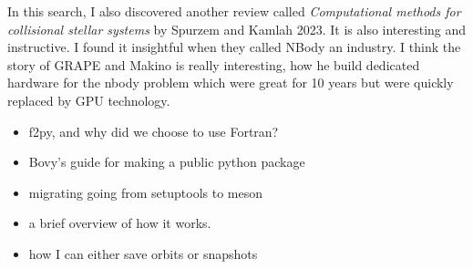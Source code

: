    In this search, I also discovered another review called \textit{Computational methods for collisional stellar systems} by Spurzem and Kamlah 2023. It is also interesting and instructive. I found it insightful when they called NBody an industry. I think the story of GRAPE and Makino is really interesting, how he build dedicated hardware for the nbody problem which were great for 10 years but were quickly replaced by GPU technology. 
    \begin{itemize}
        \item f2py, and why did we choose to use Fortran? 
        \item Bovy's guide for making a public python package
        \item migrating going from setuptools to meson
        \item a brief overview of how it works. 
        \item how I can either save orbits or snapshots
    \end{itemize}

